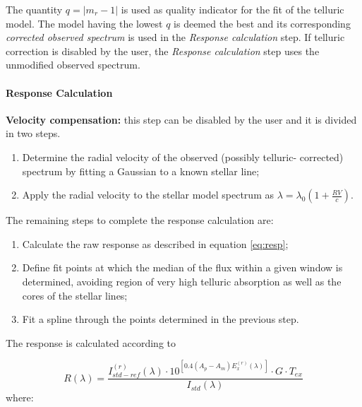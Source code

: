 The quantity $q = |m_r - 1|$ is used as quality indicator for the fit of the telluric model. The model having the lowest $q$ is deemed the best and its corresponding \textit{corrected observed spectrum} is used in the \textit{Response calculation} step. 
If telluric correction is disabled by the user, the \textit{Response calculation} step uses the unmodified observed spectrum.

\paragraph{Response Calculation}

\textbf{Velocity compensation: } this step can be disabled by the user and it is divided in two steps.
\begin{enumerate}
\item Determine the radial velocity of the observed (possibly telluric- corrected) spectrum by fitting a Gaussian to a known stellar line;
\item Apply the radial velocity to the stellar model spectrum as $\lambda = \lambda_0(1+\frac{RV}{c})$.
\end{enumerate}


The remaining steps to complete the response calculation are:
\begin{enumerate}
\item Calculate the raw response as described in equation \ref{eq:resp};
\item Define fit points at which the median of the flux within a given window is determined, avoiding region of very {high telluric absorption} as well as the cores of the stellar lines;
\item Fit a spline through the points determined in the previous step.
\end{enumerate}

The response is calculated according to 

\begin{equation}
R(\lambda)=  \frac{I_{std-ref}^{(r)}(\lambda) \cdot 10^{[ 0.4(A_p- A_m)E_x^{(r)}(\lambda)] } \cdot G \cdot T_{ex}}{I_{std}(\lambda)}
\label{eq:resp}
\end{equation}
where:

